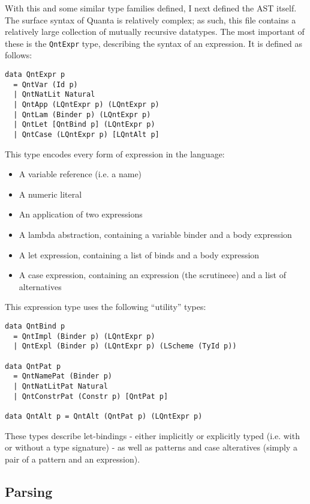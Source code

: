 \documentclass[9pt]{extarticle}
\begin{document}
With this and some similar type families defined, I next defined the AST
itself. The surface syntax of Quanta is relatively complex; as such,
this file contains a relatively large collection of mutually recursive
datatypes. The most important of these is the \verb'QntExpr' type,
describing the syntax of an expression. It is defined as follows:

\begin{verbatim}
data QntExpr p
  = QntVar (Id p)
  | QntNatLit Natural
  | QntApp (LQntExpr p) (LQntExpr p)
  | QntLam (Binder p) (LQntExpr p)
  | QntLet [QntBind p] (LQntExpr p)
  | QntCase (LQntExpr p) [LQntAlt p]
\end{verbatim}

This type encodes every form of expression in the language:
\begin{itemize}
	\item A variable reference (i.e. a name)
	\item A numeric literal
	\item An application of two expressions
	\item A lambda abstraction, containing a variable binder and a body expression
	\item A let expression, containing a list of binds and a body expression
	\item A case expression, containing an expression (the scrutineee) and a list of alternatives
\end{itemize}

This expression type uses the following ``utility'' types:

\begin{verbatim}
data QntBind p
  = QntImpl (Binder p) (LQntExpr p)
  | QntExpl (Binder p) (LQntExpr p) (LScheme (TyId p))

data QntPat p
  = QntNamePat (Binder p)
  | QntNatLitPat Natural
  | QntConstrPat (Constr p) [QntPat p]

data QntAlt p = QntAlt (QntPat p) (LQntExpr p)
\end{verbatim}

These types describe let-bindings - either implicitly or explicitly
typed (i.e. with or without a type signature) - as well as patterns and
case alteratives (simply a pair of a pattern and an expression).

\subsection{Parsing}
\end{document}
